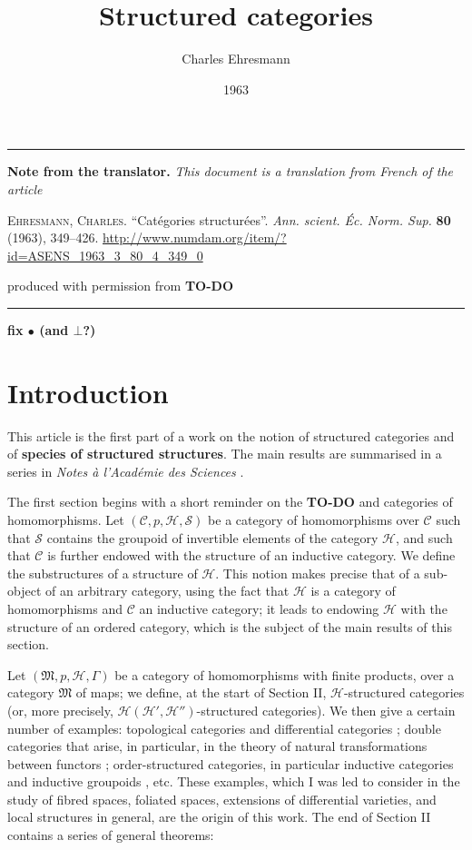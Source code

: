 \documentclass{article}
\title{Structured categories}
\author{Charles Ehresmann}
\date{1963}
\newcommand{\origcit}{%
  \textsc{Ehresmann, Charles.}
  ``Catégories structurées''.
  \emph{Ann. scient. Éc. Norm. Sup.} \textbf{80} (1963), 349--426.
  \url{http://www.numdam.org/item/?id=ASENS_1963_3_80_4_349_0}
}
\newenvironment{itenv}[1]
  {\phantomsection\par\medskip\noindent\textbf{#1.}\itshape}
  {\par\medskip}
\newcommand{\oldpage}[1]{\marginpar{\footnotesize$\Big\vert$ \textit{p.~#1}}}
\newcommand{\todo}{{\color{purple}\textbf{TO-DO }}}
\newcommand{\unsure}[1]{{\color{purple}\textbf{#1}}}
\newcommand{\CC}{\mathcal{C}}
\newcommand{\HH}{\mathcal{H}}
\renewcommand{\SS}{\mathcal{S}}
\newcommand{\MM}{\mathfrak{M}}
\newcommand{\dotc}{{\mathbin{\bullet}}}
\newcommand{\botc}{{\mathbin{\bot}}}
\begin{document}
\maketitle

\hrule
\begin{itenv}{Note from the translator}
This document is a translation from French of the article

\medskip
{\normalfont\origcit}

\medskip
produced with permission from \todo
\end{itenv}
\hrule

\tableofcontents


\unsure{fix $\dotc$ (and $\botc$?)}

\section*{Introduction}

\oldpage{349}

This article is the first part of a work on the notion of structured categories and of \unsure{species of structured structures}.
The main results are summarised in a series in \emph{Notes à l'Académie des Sciences} \cite{3e}.

The first section begins with a short reminder on the \todo and categories of homomorphisms.
Let $(\CC,p,\HH,\SS)$ be a category of homomorphisms over $\CC$ such that $\SS$ contains the groupoid of invertible elements of the category $\HH$, and such that $\CC$ is further endowed with the structure of an inductive category.
We define the substructures of a structure of $\HH$.
This notion makes precise that of a sub-object of an arbitrary category, using the fact that $\HH$ is a category of homomorphisms and $\CC$ an inductive category;
it leads to endowing $\HH$ with the structure of an ordered category, which is the subject of the main results of this section.

Let $(\MM,p,\HH,\Gamma)$ be a category of homomorphisms with finite products, over a category $\MM$ of maps;
we define, at the start of Section II, $\HH$-structured categories (or, more precisely, $\HH(\HH',\HH'')$-structured categories).
We then give a certain number of examples: topological categories and differential categories \cite{3b}; double categories that arise, in particular, in the theory of natural transformations between functors \cite{3d}; order-structured categories, in particular inductive categories and inductive groupoids \cite{3c}, etc.
\oldpage{350}
These examples, which I was led to consider in the study of fibred spaces, foliated spaces, extensions of differential varieties, and local structures in general, are the origin of this work.
The end of Section II contains a series of general theorems:
\end{document}
